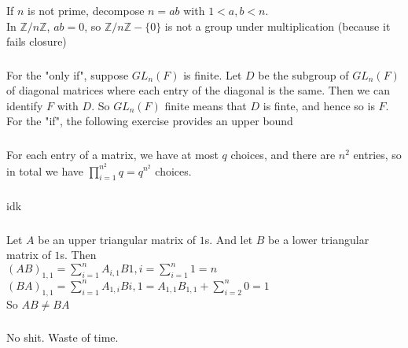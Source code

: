 \documentclass{article}
\newcommand{\ints}{\mathbb{Z}}
\newcommand{\set}[1]{ \{ #1 \} }
\begin{document}
\subsubsection{}\label{ex4p4}
If $n$ is not prime, decompose $n = ab$ with $1<a,b<n$.\\
In $\ints/n\ints$, $ab = 0$, so $\ints/n\ints - \set{0}$ is not a group under multiplication (because it fails closure)
\subsubsection{}\label{ex4p5}
For the "only if", suppose $GL_n(F)$ is finite. Let $D$ be the subgroup of $GL_n(F)$ of diagonal matrices where each entry of the diagonal is the same. Then we can identify $F$ with $D$. So $GL_n(F)$ finite means that $D$ is finte, and hence so is $F$.\\
For the "if", the following exercise provides an upper bound
\subsubsection{}\label{ex4p6}
For each entry of a matrix, we have at most $q$ choices, and there are $n^2$ entries, so in total we have $\prod_{i=1}^{n^2}q = q^{n^2}$ choices.
\subsubsection{}\label{ex4p7}
idk
\subsubsection{}\label{ex4p8}
Let $A$ be an upper triangular matrix of $1$s. And let $B$ be a lower triangular matrix of $1$s. Then\\
$(AB)_{1,1} = \sum_{i=1}^nA_{i,1}B{1,i} = \sum_{i=1}^n 1 = n$\\
$(BA)_{1,1} = \sum_{i=1}^nA_{1,i}B{i,1} = A_{1,1}B_{1,1} + \sum_{i=2}^n 0 = 1$\\
So $AB \neq BA$
\subsubsection{}\label{ex4p9}
No shit. Waste of time.
\end{document}
